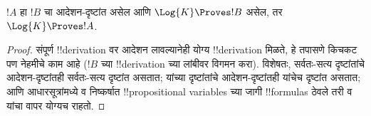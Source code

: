 \documentclass[../../../include/open-logic-section]{subfiles}
\begin{document}
\begin{prop}
  $!A$ हा $!B$ चा आदेशन-दृष्टांत असेल आणि
  $\Log{K} \Proves !B$ असेल, तर $\Log{K} \Proves !A$.
\end{prop}

\begin{proof}
  संपूर्ण !!{derivation} वर आदेशन लावल्यानेही योग्य
  !!{derivation} मिळते, हे तपासणे किचकट पण नेहमीचे
  काम आहे ($!B$ च्या !!{derivation} च्या लांबीवर
  विगमन करा). विशेषतः, सर्वतः-सत्य दृष्टांतांचे
  आदेशन-दृष्टांतही सर्वतः-सत्य दृष्टांत असतात;
  यांच्या दृष्टांतांचे आदेशन-दृष्टांतही
  यांचेच दृष्टांत असतात; आणि आधारसूत्रांमध्ये
  व निष्कर्षात !!{propositional variable}s च्या
  जागी !!{formula}s ठेवले तरी \MP{} व~\Nec{}
  यांचा वापर योग्यच राहतो.
\end{proof}
\end{document}

